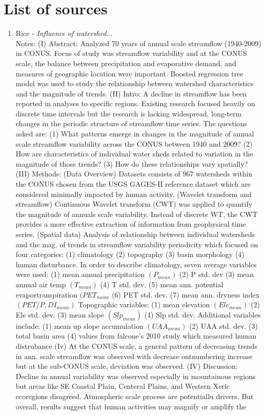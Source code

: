 \documentclass{article}
\begin{document}
\section{List of sources}

\begin{enumerate}

    \item Rice - \textit{Influence of watershed}...\\ Notes: (I) Abstract: Analyzed 70 years of annual scale streamflow (1940-2009) in CONUS. Focus of study was streamflow variability and at the CONUS scale, the balance between precipitation and evaporative demand, and measures of geographic location were important. Boosted regression tree model was used to study the relationship between watershed characteristics and the magnitude of trends. (II) Intro: A decline in streamflow has been reported in analyses to specific regions. Existing research focused heavily on discrete time intervals but the research is lacking widespread, long-term changes in the periodic structure of streamflow time series. The questions asked are: (1) What patterns emerge in changes in the magnitude of annual scale streamflow variability across the CONUS between 1940 and 2009? (2) How are characteristics of individual water sheds related to variation in the magnitude of those trends? (3) How do these relationships vary spatially? (III) Methods: (Data Overview) Datasets consists of 967 watersheds within the CONUS chosen from the USGS GAGES-II reference dataset which are considered minimally impacted by human activity. (Wavelet transform and streamflow) Continuous Wavelet transform (CWT) was applied to quantify the magnitude of annuals scale variability. Instead of discrete WT, the CWT provides a more effective extraction of information from geophysical time series. (Spatial data) Analysis of relationship between individual watersheds and the mag. of trends in streamflow variability periodicity which focused on four categories: (1) climatology (2) topography (3) basin morphology (4) human disturbance. In order to describe climatology, seven average variables were used: (1) mean annual precipitation $(P_\textit{mean})$ (2) P std. dev (3) mean annual air temp $(T_\textit{mean})$ (4) T std. dev. (5) mean ann. potential evaportranspiration $(PET_\textit{mean}$ (6) PET std. dev. (7) mean ann. dryness index $(PET/P, DI_\textit{mean})$ Topographic variables: (1) mean elevation $(Ele_\textit{mean})$ (2) Ele std. dev. (3) mean slope $(Slp_\textit{mean})$ (4) Slp std. dev.  Additional variables include: (1) mean up slope accumulation $(UAA_\textit{mean})$ (2) UAA std. dev. (3) total basin area (4) values from falcone's 2010 study which measured human distrubance (Iv) At the CONUS scale, a general pattern of decreasing trends in ann. scale streamflow was observed with decrease outnumbering increase but at the sub-CONUS scale, deviation was observed. (IV) Discussion: Decline in annual variability was observed especially in mountainous regions but areas like SE Coastal Plain, Centeral Plains, and Western Xeric ecoregions disagreed. Atmospheric scale process are potentiallu drivers. But overall, results suggest that human activities may magnify or amplify the 
\end{enumerate}
\end{document}
